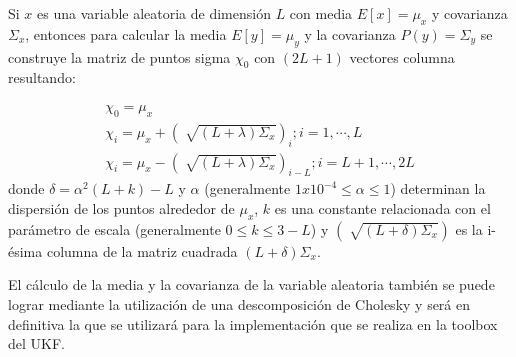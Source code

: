 Si $x$ es una variable aleatoria de dimensión $L$ con media $E[x] = \mu_{x}$ y covarianza $\Sigma_{x}$, entonces para calcular la media $E[y]=\mu_{y}$ y la covarianza $P(y) = \Sigma_{y}$ se construye la matriz de puntos sigma $\chi_{0}$ con $(2L+1)$ vectores columna \cite{houshangi_accurate_2005} \cite{chow_unscented_2007} resultando:

\begin{eqnarray}\label{Ec:Chi_UKF_UT}
\nonumber \chi_{0} = \mu_{x} \\
\nonumber \chi_{i} = \mu_{x} + (\sqrt[]{(L+ \lambda)\Sigma_{x}})_{i} ; i=1,\cdots,L \\
\chi_{i} = \mu_{x} - (\sqrt[]{(L+ \lambda)\Sigma_{x}})_{i-L} ; i=L+1,\cdots,2L 
\end{eqnarray}
donde $\delta = \alpha^{2}(L+k)-L$ y $\alpha$ (generalmente $1x10^{-4} \le \alpha \le 1 $) determinan la dispersión de los puntos alrededor de $\mu_{x}$, $k$ es una constante relacionada con el parámetro de escala (generalmente $0 \le k \le 3-L$) y $(\sqrt[]{(L+ \delta)\Sigma_{x}})$ es la i-ésima columna de la matriz cuadrada $(L+ \delta)\Sigma_{x}$.

El cálculo de la media y la covarianza de la variable aleatoria también se puede lograr mediante la utilización de una descomposición de Cholesky \cite{oh_development_2006} \cite{_leyton_2009} y será en definitiva la que se utilizará para la implementación que se realiza en la toolbox \cite{toolbox_simo} del \ac{UKF}.

